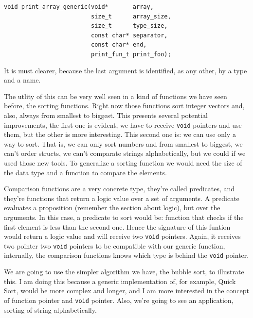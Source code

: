 \documentclass[a4paper]{article}
\begin{document}
\noindent
\begin{minipage}[H]{\linewidth}
\mbox{}
\begin{lstlisting}[style=C,
caption={Ejemplo final de función que recibe un puntero},
label={lst:finalPointerFunction}]
void print_array_generic(void*       array,
                         size_t      array_size,
                         size_t      type_size,
                         const char* separator,
                         const char* end,
                         print_fun_t print_foo);
\end{lstlisting}
\end{minipage}

It is must clearer, because the last argument is identified, as any other, by
a type and a name.

The utlity of this can be very well seen in a kind of functions we have seen
before, the sorting functions. Right now those functions sort integer vectors
and, also, always from smallest to biggest. This presents several potential
improvements, the first one is evident, we have to receive \verb!void! pointers
and use them, but the other is more interesting. This second one is: we can use
only a way to sort. That is, we can only sort numbers and from smallest
to biggest, we can't order structs, we can't comparate strings alphabetically,
but we could if we used those new tools. To generalize a sorting function we
would need the size of the data type and a function to compare the elements.

Comparison functions are a very concrete type, they're called predicates, and
they're functions that return a logic value over a set of arguments. A predicate
evaluates a proposition (remember the section about logic), but over the
arguments. In this case, a predicate to sort would be: function that checks if
the first element is less than the second one. Hence the signature of this
funtion would return a logic value and will receive two \verb!void! pointers.
Again, it receives two pointer two \verb!void! pointers to be compatible with
our generic function, internally, the comparison functions knows which type
is behind the \verb!void! pointer.

We are going to use the simpler algorithm we have, the bubble sort, to
illustrate this. I am doing this because a generic implementation of, for
example, Quick Sort, would be more complex and longer, and I am more interested
in the concept of function pointer and \verb!void! pointer. Also, we're going to
see an application, sorting of string alphabetically.
\end{document}
